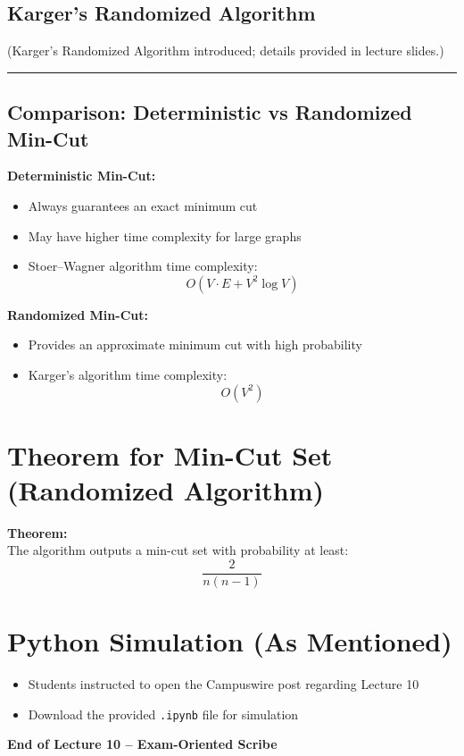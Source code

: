 \documentclass[12pt]{article}
\begin{document}
\subsection{Karger’s Randomized Algorithm}

(Karger’s Randomized Algorithm introduced; details provided in lecture slides.)

\hrule
\vspace{1em}

\subsection{Comparison: Deterministic vs Randomized Min-Cut}

\textbf{Deterministic Min-Cut:}
\begin{itemize}
    \item Always guarantees an exact minimum cut
    \item May have higher time complexity for large graphs
    \item Stoer–Wagner algorithm time complexity:
    \[
    O(V \cdot E + V^2 \log V)
    \]
\end{itemize}

\textbf{Randomized Min-Cut:}
\begin{itemize}
    \item Provides an approximate minimum cut with high probability
    \item Karger’s algorithm time complexity:
    \[
    O(V^2)
    \]
\end{itemize}

\section{Theorem for Min-Cut Set (Randomized Algorithm)}

\textbf{Theorem:} \\
The algorithm outputs a min-cut set with probability at least:
\[
\frac{2}{n(n-1)}
\]

\section{Python Simulation (As Mentioned)}

\begin{itemize}
    \item Students instructed to open the Campuswire post regarding Lecture 10
    \item Download the provided \texttt{.ipynb} file for simulation
\end{itemize}

\vspace{2em}
\textbf{End of Lecture 10 – Exam-Oriented Scribe}
\end{document}
